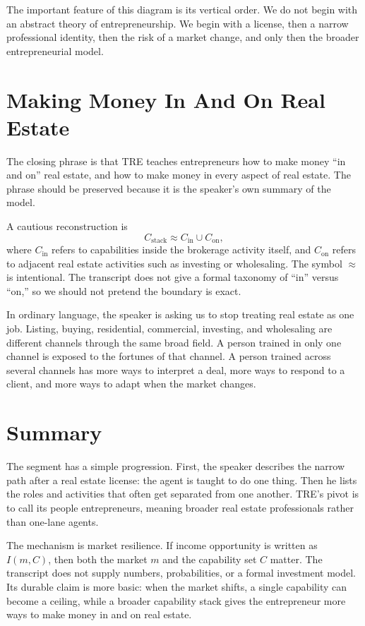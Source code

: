 The important feature of this diagram is its vertical order. We do not begin with an abstract theory of entrepreneurship. We begin with a license, then a narrow professional identity, then the risk of a market change, and only then the broader entrepreneurial model.

\section{Making Money In And On Real Estate}

The closing phrase is that TRE teaches entrepreneurs how to make money ``in and on'' real estate, and how to make money in every aspect of real estate. The phrase should be preserved because it is the speaker's own summary of the model.

A cautious reconstruction is
\begin{equation}
C_{\text{stack}}
\approx
C_{\text{in}}\cup C_{\text{on}},
\end{equation}
where \(C_{\text{in}}\) refers to capabilities inside the brokerage activity itself, and \(C_{\text{on}}\) refers to adjacent real estate activities such as investing or wholesaling. The symbol \(\approx\) is intentional. The transcript does not give a formal taxonomy of ``in'' versus ``on,'' so we should not pretend the boundary is exact.

In ordinary language, the speaker is asking us to stop treating real estate as one job. Listing, buying, residential, commercial, investing, and wholesaling are different channels through the same broad field. A person trained in only one channel is exposed to the fortunes of that channel. A person trained across several channels has more ways to interpret a deal, more ways to respond to a client, and more ways to adapt when the market changes.

\section{Summary}

The segment has a simple progression. First, the speaker describes the narrow path after a real estate license: the agent is taught to do one thing. Then he lists the roles and activities that often get separated from one another. TRE's pivot is to call its people entrepreneurs, meaning broader real estate professionals rather than one-lane agents.

The mechanism is market resilience. If income opportunity is written as \(I(m,C)\), then both the market \(m\) and the capability set \(C\) matter. The transcript does not supply numbers, probabilities, or a formal investment model. Its durable claim is more basic: when the market shifts, a single capability can become a ceiling, while a broader capability stack gives the entrepreneur more ways to make money in and on real estate.